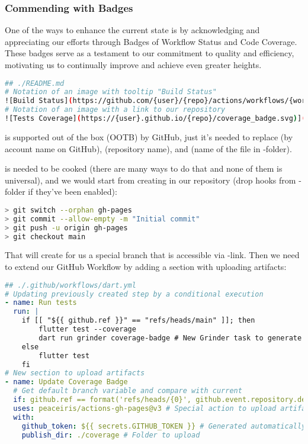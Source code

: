 \subsubsection{Commending with Badges} \label{a-badges}

One of the ways to enhance the current state is by acknowledging and appreciating our efforts through Badges of Workflow 
Status and Code Coverage. These badges serve as a testament to our commitment to quality and efficiency, motivating us 
to continually improve and achieve even greater heights.

\begin{lstlisting}[language=bash]
## ./README.md
# Notation of an image with tooltip "Build Status" 
![Build Status](https://github.com/{user}/{repo}/actions/workflows/{workflow-name}.yml/badge.svg?branch=main)
# Notation of an image with a link to our repository
![Tests Coverage](https://{user}.github.io/{repo}/coverage_badge.svg)](https://github.com/{user}/{repo})
\end{lstlisting}

 is supported out of the box (OOTB) by GitHub, just it's needed to replace  (by account name
on GitHub),  (repository name), and  (name of the file in -folder).

 is needed to be cooked (there are many ways to do that and none of them is universal), and we would 
start from creating  in our repository (drop hooks from -folder if they've been enabled):

\begin{lstlisting}[language=bash]
> git switch --orphan gh-pages
> git commit --allow-empty -m "Initial commit"
> git push -u origin gh-pages
> git checkout main
\end{lstlisting}

\noindent That will create for us a special branch that is accessible via -link. 
Then we need to extend our GitHub Workflow by adding a section with uploading artifacts:

\begin{lstlisting}[language=yaml]
## ./.github/workflows/dart.yml
# Updating previously created step by a conditional execution
- name: Run tests
  run: |
    if [[ "${{ github.ref }}" == "refs/heads/main" ]]; then
        flutter test --coverage
        dart run grinder coverage-badge # New Grinder task to generate '.svg'-file with coverage
    else
        flutter test
    fi
# New section to upload artifacts
- name: Update Coverage Badge
  # Get default branch variable and compare with current
  if: github.ref == format('refs/heads/{0}', github.event.repository.default_branch)
  uses: peaceiris/actions-gh-pages@v3 # Special action to upload artifacts
  with:
    github_token: ${{ secrets.GITHUB_TOKEN }} # Generated automatically by GitHub
    publish_dir: ./coverage # Folder to upload
\end{lstlisting}


